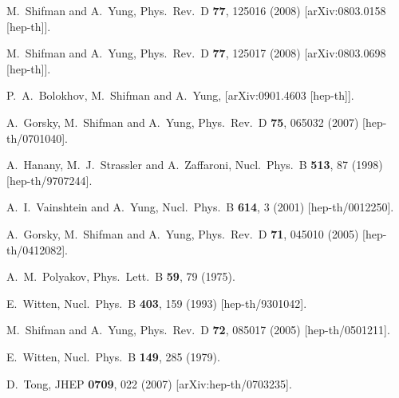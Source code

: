 \documentclass[12pt]{article}
\begin{document}
\begin{thebibliography}{99}
  M.~Shifman and A.~Yung,
  Phys.\ Rev.\  D {\bf 77}, 125016 (2008)
  [arXiv:0803.0158 [hep-th]].
     
M.~Shifman and A.~Yung,
  Phys.\ Rev.\  D {\bf 77}, 125017 (2008)
  [arXiv:0803.0698 [hep-th]].
     
  P.~A.~Bolokhov, M.~Shifman and A.~Yung,
  [arXiv:0901.4603 [hep-th]].

A.~Gorsky, M.~Shifman and A.~Yung,
Phys.\ Rev.\  D {\bf 75}, 065032 (2007)
  [hep-th/0701040].

A.~Hanany, M.~J.~Strassler and A.~Zaffaroni,
Nucl.\ Phys.\ B {\bf 513}, 87 (1998)
[hep-th/9707244].

A.~I.~Vainshtein and A.~Yung,
Nucl.\ Phys.\ B {\bf 614}, 3 (2001)
[hep-th/0012250].

A.~Gorsky, M.~Shifman and A.~Yung,
  Phys.\ Rev.\ D {\bf 71}, 045010 (2005)
  [hep-th/0412082].

A.~M.~Polyakov,
Phys.\ Lett.\ B {\bf 59}, 79 (1975).

E.~Witten,
  Nucl.\ Phys.\ B {\bf 403}, 159 (1993)
  [hep-th/9301042].



M.~Shifman and A.~Yung,
Phys.\ Rev.\ D {\bf 72}, 085017 (2005)
[hep-th/0501211].

E.~Witten,
Nucl.\ Phys.\ B {\bf 149}, 285 (1979).

  D.~Tong,
  JHEP {\bf 0709}, 022 (2007)
  [arXiv:hep-th/0703235].


\end{thebibliography}
\end{document}
